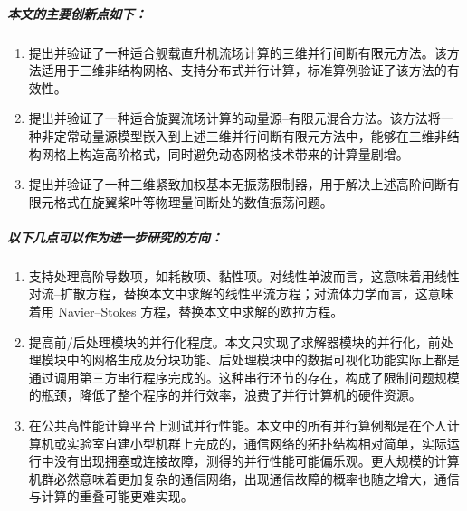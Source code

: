 \subparagraph*{本文的主要创新点如下：}
\begin{enumerate}[wide]
\item 提出并验证了一种适合舰载直升机流场计算的三维并行间断有限元方法。该方法适用于三维非结构网格、支持分布式并行计算，标准算例验证了该方法的有效性。
\item 提出并验证了一种适合旋翼流场计算的动量源–有限元混合方法。该方法将一种非定常动量源模型嵌入到上述三维并行间断有限元方法中，能够在三维非结构网格上构造高阶格式，同时避免动态网格技术带来的计算量剧增。
\item 提出并验证了一种三维紧致加权基本无振荡限制器，用于解决上述高阶间断有限元格式在旋翼桨叶等物理量间断处的数值振荡问题。
\end{enumerate}
%

\subparagraph*{以下几点可以作为进一步研究的方向：}
\begin{enumerate}[wide]
\item 支持处理高阶导数项，如耗散项、黏性项。对线性单波而言，这意味着用线性对流–扩散方程，替换本文中求解的线性平流方程；对流体力学而言，这意味着用
Navier–Stokes 方程，替换本文中求解的欧拉方程。 
\item 提高前/后处理模块的并行化程度。本文只实现了求解器模块的并行化，前处理模块中的网格生成及分块功能、后处理模块中的数据可视化功能实际上都是通过调用第三方串行程序完成的。这种串行环节的存在，构成了限制问题规模的瓶颈，降低了整个程序的并行效率，浪费了并行计算机的硬件资源。
\item 在公共高性能计算平台上测试并行性能。本文中的所有并行算例都是在个人计算机或实验室自建小型机群上完成的，通信网络的拓扑结构相对简单，实际运行中没有出现拥塞或连接故障，测得的并行性能可能偏乐观。更大规模的计算机群必然意味着更加复杂的通信网络，出现通信故障的概率也随之增大，通信与计算的重叠可能更难实现。
\end{enumerate}
%

